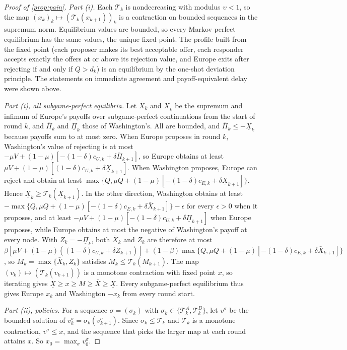 \begin{proof}[Proof of \cref{prop:pain}]
\emph{Part (i).} Each $\mathcal T_k$ is nondecreasing with modulus $\upsilon<1$, so the map $(x_k)_k\mapsto(\mathcal T_k(x_{k+1}))_k$ is a contraction on bounded sequences in the supremum norm. Equilibrium values are bounded, so every Markov perfect equilibrium has the same values, the unique fixed point. The profile built from the fixed point (each proposer makes its best acceptable offer, each responder accepts exactly the offers at or above its rejection value, and Europe exits after rejecting if and only if $Q>d_k$) is an equilibrium by the one-shot deviation principle. The statements on immediate agreement and payoff-equivalent delay were shown above.

\emph{Part (i), all subgame-perfect equilibria.} Let $\bar X_k$ and $\underline X_k$ be the supremum and infimum of Europe's payoffs over subgame-perfect continuations from the start of round $k$, and $\bar\Pi_k$ and $\underline\Pi_k$ those of Washington's. All are bounded, and $\bar\Pi_k\le-\underline X_k$ because payoffs sum to at most zero. When Europe proposes in round $k$, Washington's value of rejecting is at most $-\mu V+(1-\mu)[-(1-\delta)c_{U,k}+\delta\bar\Pi_{k+1}]$, so Europe obtains at least $\mu V+(1-\mu)[(1-\delta)c_{U,k}+\delta\underline X_{k+1}]$. When Washington proposes, Europe can reject and obtain at least $\max\{Q,\mu Q+(1-\mu)[-(1-\delta)c_{E,k}+\delta\underline X_{k+1}]\}$. Hence $\underline X_k\ge\mathcal T_k(\underline X_{k+1})$. In the other direction, Washington obtains at least $-\max\{Q,\mu Q+(1-\mu)[-(1-\delta)c_{E,k}+\delta\bar X_{k+1}]\}-\epsilon$ for every $\epsilon>0$ when it proposes, and at least $-\mu V+(1-\mu)[-(1-\delta)c_{U,k}+\delta\underline\Pi_{k+1}]$ when Europe proposes, while Europe obtains at most the negative of Washington's payoff at every node. With $Z_k=-\underline\Pi_k$, both $\bar X_k$ and $Z_k$ are therefore at most $\beta[\mu V+(1-\mu)((1-\delta)c_{U,k}+\delta Z_{k+1})]+(1-\beta)\max\{Q,\mu Q+(1-\mu)[-(1-\delta)c_{E,k}+\delta\bar X_{k+1}]\}$, so $M_k=\max\{\bar X_k,Z_k\}$ satisfies $M_k\le\mathcal T_k(M_{k+1})$. The map $(v_k)\mapsto(\mathcal T_k(v_{k+1}))$ is a monotone contraction with fixed point $x$, so iterating gives $\underline X\ge x\ge M\ge\bar X\ge\underline X$. Every subgame-perfect equilibrium thus gives Europe $x_k$ and Washington $-x_k$ from every round start.

\emph{Part (ii), policies.} For a sequence $\sigma=(\sigma_k)$ with $\sigma_k\in\{\mathcal T^A_k,\mathcal T^B_k\}$, let $v^\sigma$ be the bounded solution of $v^\sigma_k=\sigma_k(v^\sigma_{k+1})$. Since $\sigma_k\le\mathcal T_k$ and $\mathcal T_k$ is a monotone contraction, $v^\sigma\le x$, and the sequence that picks the larger map at each round attains $x$. So $x_0=\max_\sigma v^\sigma_0$.


\end{proof}
